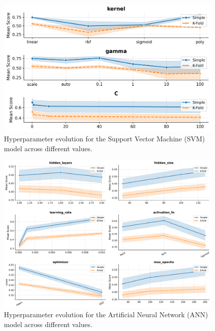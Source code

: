\begin{figure}
	\begin{center}
		\includegraphics[width=0.99\textwidth]{../images/models/svm_hyperparameters_evolution.png}
	\end{center}
	\caption{Hyperparameter evolution for the Support Vector Machine (SVM) model
		across different values.}
\end{figure}

\begin{figure}
	\begin{center}
		\includegraphics[width=0.99\textwidth]{../images/models/ann_hyperparameters_evolution.png}
	\end{center}
	\caption{Hyperparameter evolution for the Artificial Neural Network (ANN)
		model across different values.}
	\label{fig:figA14}
\end{figure}

